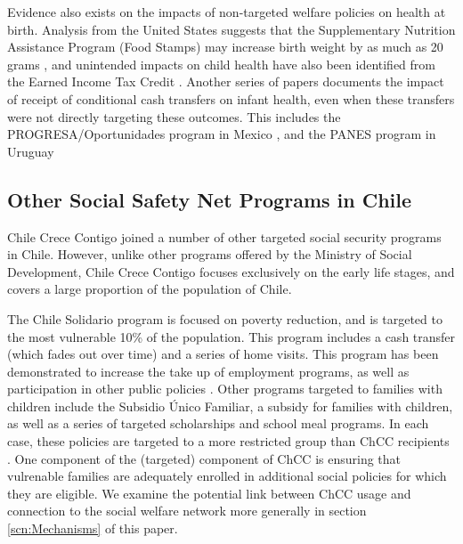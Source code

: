 \documentclass[12pt]{article}
\begin{document}
\begin{spacing}{1.4}
Evidence also exists on the impacts of non-targeted welfare policies
on health at birth.  Analysis from the United States suggests that the
Supplementary Nutrition Assistance Program (Food Stamps) may increase
birth weight by as much as 20 grams \citep{Almondetal2011}, and
unintended impacts on child health have also been identified from the
Earned Income Tax Credit \citep{Hoynesetal2015}.  Another series of
papers documents the impact of receipt of conditional cash transfers
on infant health, even when these transfers were not directly targeting
these outcomes.  This includes the PROGRESA/Oportunidades program
in Mexico \citep{Barham2011}, and the PANES program in Uruguay
\citep{Amaranteetal2016}



\subsection{Other Social Safety Net Programs in Chile}
Chile Crece Contigo joined a number of other targeted social
security programs in Chile.  However, unlike other programs
offered by the Ministry of Social Development, Chile Crece
Contigo focuses exclusively on the early life stages, and
covers a large proportion of the population of Chile.

The Chile Solidario program is focused on poverty reduction, and
is targeted to the most vulnerable 10\% of the population.  This
program includes a cash transfer (which fades out over time) and
a series of home visits.  This program has been demonstrated to
increase the take up of employment programs, as well as participation
in other public policies \citep{Carneiroetal2014}.  Other
programs targeted to families with children include the Subsidio
\'Unico Familiar, a subsidy for families with children, as well
as a series of targeted scholarships and school meal programs.
In each case, these policies are targeted to a more restricted
group than ChCC recipients \citep{Herreraetal2010}.  One
component of the (targeted) component of ChCC is ensuring that
vulrenable families are adequately enrolled in additional
social policies for which they are eligible.  We examine the
potential link between ChCC usage and connection to the social
welfare network more generally in section \ref{scn:Mechanisms} of
this paper.


\end{spacing}
\end{document}
